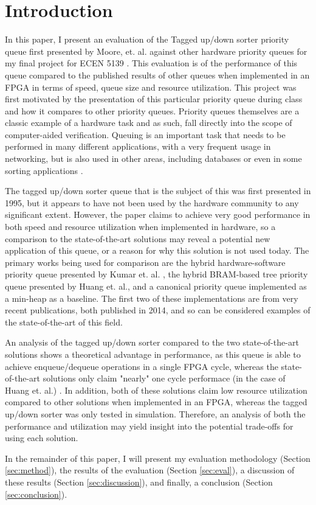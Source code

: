 \section{Introduction}
\label{sec:intro}

In this paper, I present an evaluation of the Tagged up/down sorter priority queue first presented by Moore, et. al. against other hardware priority queues for my final project for ECEN 5139 \cite{moore}. This evaluation is of the performance of this queue compared to the published results of other queues when implemented in an FPGA in terms of speed, queue size and resource utilization. This project was first motivated by the presentation of this particular priority queue during class and how it compares to other priority queues. Priority queues themselves are a classic example of a hardware task and as such, fall directly into the scope of computer-aided verification. Queuing is an important task that needs to be performed in many different applications, with a very frequent usage in networking, but is also used in other areas, including databases or even in some sorting applications \cite{huang}.

The tagged up/down sorter queue that is the subject of this was first presented in 1995, but it appears to have not been used by the hardware community to any significant extent. However, the paper claims to achieve very good performance in both speed and resource utilization when implemented in hardware, so a comparison to the state-of-the-art solutions may reveal a potential new application of this queue, or a reason for why this solution is not used today. The primary works being used for comparison are the hybrid hardware-software priority queue presented by Kumar et. al. \cite{kumar}, the hybrid BRAM-based tree priority queue presented by Huang et. al., and a canonical priority queue implemented as a min-heap as a baseline. The first two of these implementations are from very recent publications, both published in 2014, and so can be considered examples of the state-of-the-art of this field.

An analysis of the tagged up/down sorter compared to the two state-of-the-art solutions shows a theoretical advantage in performance, as this queue is able to achieve enqueue/dequeue operations in a single FPGA cycle, whereas the state-of-the-art solutions only claim "nearly" one cycle performace (in the case of Huang et. al.) \cite{Huang}. In addition, both of these solutions  claim low resource utilization compared to other solutions when implemented in an FPGA, whereas the tagged up/down sorter was only tested in simulation. Therefore, an analysis of both the performance and utilization may yield insight into the potential trade-offs for using each solution.

In the remainder of this paper, I will present my evaluation methodology (Section \ref{sec:method}), the results of the evaluation (Section \ref{sec:eval}), a discussion of these results (Section \ref{sec:discussion}), and finally, a conclusion (Section \ref{sec:conclusion}).